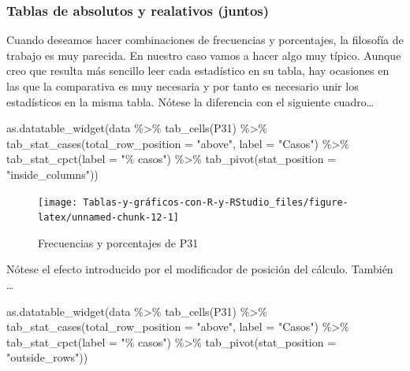 \documentclass[
]{book}
\newenvironment{Shaded}{\begin{snugshade}}{\end{snugshade}}
\newcommand{\AttributeTok}[1]{\textcolor[rgb]{0.77,0.63,0.00}{#1}}
\newcommand{\FunctionTok}[1]{\textcolor[rgb]{0.00,0.00,0.00}{#1}}
\newcommand{\NormalTok}[1]{#1}
\newcommand{\SpecialCharTok}[1]{\textcolor[rgb]{0.00,0.00,0.00}{#1}}
\newcommand{\StringTok}[1]{\textcolor[rgb]{0.31,0.60,0.02}{#1}}
\begin{document}
\hypertarget{tablas-de-absolutos-y-realativos-juntos}{%
\subsubsection{Tablas de absolutos y realativos (juntos)}\label{tablas-de-absolutos-y-realativos-juntos}}

Cuando deseamos hacer combinaciones de frecuencias y porcentajes, la filosofía de trabajo es muy parecida. En nuestro caso vamos a hacer algo muy típico. Aunque creo que resulta más sencillo leer cada estadístico en su tabla, hay ocasiones en las que la comparativa es muy necesaria y por tanto es necesario unir los estadísticos en la misma tabla. Nótese la diferencia con el siguiente cuadro\ldots{}

\begin{Shaded}
\begin{Highlighting}[]
\FunctionTok{as.datatable\_widget}\NormalTok{(data }\SpecialCharTok{\%\textgreater{}\%} \FunctionTok{tab\_cells}\NormalTok{(P31) }\SpecialCharTok{\%\textgreater{}\%} \FunctionTok{tab\_stat\_cases}\NormalTok{(}\AttributeTok{total\_row\_position =} \StringTok{"above"}\NormalTok{, }
  \AttributeTok{label =} \StringTok{"Casos"}\NormalTok{) }\SpecialCharTok{\%\textgreater{}\%} \FunctionTok{tab\_stat\_cpct}\NormalTok{(}\AttributeTok{label =} \StringTok{"\% casos"}\NormalTok{) }\SpecialCharTok{\%\textgreater{}\%} 
  \FunctionTok{tab\_pivot}\NormalTok{(}\AttributeTok{stat\_position =} \StringTok{"inside\_columns"}\NormalTok{))}
\end{Highlighting}
\end{Shaded}

\begin{figure}[H]

{\centering \texttt{[image: Tablas-y-gráficos-con-R-y-RStudio\_files/figure-latex/unnamed-chunk-12-1]} 

}

\caption{Frecuencias y porcentajes de P31}\label{fig:unnamed-chunk-12}
\end{figure}

Nótese el efecto introducido por el modificador de posición del cálculo. También \ldots{}

\begin{Shaded}
\begin{Highlighting}[]
\FunctionTok{as.datatable\_widget}\NormalTok{(data }\SpecialCharTok{\%\textgreater{}\%} \FunctionTok{tab\_cells}\NormalTok{(P31) }\SpecialCharTok{\%\textgreater{}\%} \FunctionTok{tab\_stat\_cases}\NormalTok{(}\AttributeTok{total\_row\_position =} \StringTok{"above"}\NormalTok{, }
  \AttributeTok{label =} \StringTok{"Casos"}\NormalTok{) }\SpecialCharTok{\%\textgreater{}\%} \FunctionTok{tab\_stat\_cpct}\NormalTok{(}\AttributeTok{label =} \StringTok{"\% casos"}\NormalTok{) }\SpecialCharTok{\%\textgreater{}\%} 
  \FunctionTok{tab\_pivot}\NormalTok{(}\AttributeTok{stat\_position =} \StringTok{"outside\_rows"}\NormalTok{))}
\end{Highlighting}
\end{Shaded}
\end{document}
